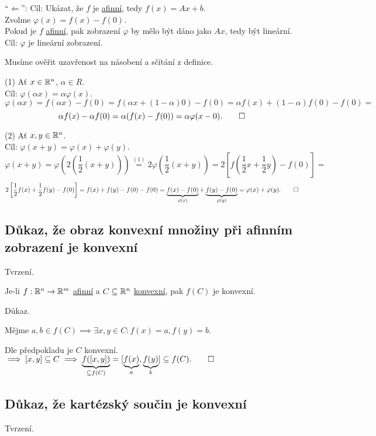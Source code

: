 \enquote{$\Leftarrow$}:
Cíl: Ukázat, že $f$ je \hyperref[sec:afin]{afinní}, tedy $f(x) = Ax + b$.\\
Zvolme $\varphi(x) = f(x) - f(0)$.\\
Pokud je $f$ \hyperref[sec:afin]{afinní}, pak zobrazení $\varphi$ by mělo být dáno jako $Ax$, tedy být lineární.\\
Cíl: $\varphi$ je lineární zobrazení.

Musíme ověřit uzavřenost na násobení a sčítání z definice.

(1) Ať $x \in \mathbb{R}^n$, $\alpha \in R$.\\
Cíl: $\varphi(\alpha x) = \alpha \varphi(x)$.
\[
    \varphi(\alpha x) = f(\alpha x) - f(0) = f(\alpha x + (1-\alpha)0) - f(0) = \alpha f(x) + (1-\alpha)f(0) - f(0) =
\]
\[
    \alpha f(x) - \alpha f(0) = \alpha (f(x) - f(0)) = \alpha \varphi (x-0). \qed
\]

(2) Ať $x, y \in \mathbb{R}^n$.\\
Cíl: $\varphi(x+y) = \varphi(x) + \varphi(y)$.
\[
    \varphi(x+y) = 
    \varphi \left(2 \left(\frac{1}{2} (x+y)\right)\right) \stackrel{(1)}{=} 2 \varphi \left(\frac{1}{2} (x+y)\right) =
    2 \left[f(\frac{1}{2}x + \frac{1}{2}y) - f(0)\right] = 
\]
\[
    2 \left[\frac{1}{2} f(x) + \frac{1}{2}f(y) - f(0) \right] = f(x) + f(y) - f(0) - f(0) = 
    \underbrace{f(x) - f(0)}_{\varphi(x)} + \underbrace{f(y) - f(0)}_{\varphi(y)} =
    \varphi(x) + \varphi(y). \qed
\]

\subsection{Důkaz, že obraz konvexní množiny při afinním zobrazení je konvexní}
Tvrzení.

Je-li $f: \mathbb{R}^n \rightarrow \mathbb{R}^m$ \hyperref[sec:afin]{afinní} a $C \subseteq \mathbb{R}^n$ \hyperref[sec:konvex]{konvexní}, pak
$f(C)$ je konvexní.

Důkaz.

Mějme $a, b \in f(C) \implies \exists x, y \in C: f(x)=a, f(y)=b$.

Dle předpokladu je $C$ konvexní. $\implies [x, y] \subseteq C \implies \underbrace{f([x, y])}_{\subseteq f(C)} =
[\underbrace{f(x)}_a, \underbrace{f(y)}_b] \subseteq f(C). \qed$

\subsection{Důkaz, že kartézský součin je konvexní}
Tvrzení.

